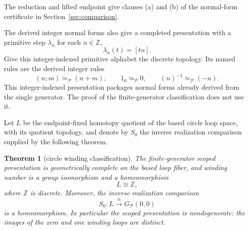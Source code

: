 \documentclass[10pt,reqno]{amsart}
\theoremstyle{definition}
\theoremstyle{plain}
\newtheorem{theorem}[definition]{Theorem}
\theoremstyle{remark}
\newcommand{\RwEq}{\mathrel{\simeq_{\!\mathcal P}}}
\newcommand{\Z}{\mathbb Z}
\begin{document}
The reduction and lifted endpoint give clauses (a) and (b) of the
normal-form certificate in Section~\ref{sec:comparison}.

The derived integer normal forms also give a completed presentation
with a primitive step $\lambda_n$ for each $n\in\Z$,
\[
  \lambda_n(t)=[tn].
\]
Give this integer-indexed primitive alphabet the discrete topology.
Its named rules are the derived integer rules
\[
  (n;m)\RwEq(n+m),\qquad 1_0\RwEq 0,
  \qquad (n)^{-1}\RwEq(-n).
\]
This integer-indexed presentation packages normal forms already derived
from the single generator.  The proof of the finite-generator classification
does not use it.

Let $L$ be the endpoint-fixed homotopy quotient of the based circle loop
space, with its quotient topology, and denote by $S_0$ the inverse
realization comparison supplied by the following theorem.

\begin{theorem}[circle winding classification]
\label{thm:circle-winding}
The finite-generator scoped presentation is geometrically complete on the
based loop fiber, and winding number is a group isomorphism and a
homeomorphism
\[
  L\cong\Z,
\]
where $\Z$ is discrete.
Moreover, the inverse realization comparison
\[
  S_0:L\xrightarrow{\ \cong\ }G_{\mathcal P}(0,0)
\]
is a homeomorphism.  In particular the scoped presentation is
nondegenerate: the images of the zero and one winding loops are distinct.
\end{theorem}
\end{document}
